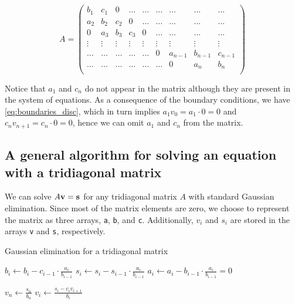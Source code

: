 \documentclass[a4paper]{article}
\begin{document}
\begin{equation}
     A = \left(\begin{array}{ccccccccc}
                   b_1 & c_1 & 0 &\dots   & \dots &\dots & \dots &\dots&\dots\\
                   a_2 & b_2 & c_2 & 0 &\dots &\dots & \dots&\dots&\dots \\
                   0 & a_3 & b_3 & c_3 & 0 & \dots & \dots&\dots&\dots \\
                   \vdots&\vdots&\vdots&\vdots&\vdots&\vdots&\vdots&\vdots&\vdots \\
                   \dots&\dots&\dots&\dots&\dots & 0 & a_{n-1}  &b_{n-1}& c_{n-1} \\
                   \dots&\dots&\dots&\dots&\dots&\dots &  0 &a_n & b_n \\
              \end{array} \right)
\end{equation}

Notice that $a_1$ and $c_{n}$ do not appear in the matrix although they are present in the system of equations. As a consequence of the boundary conditions, we have \eqref{eq:boundaries_disc}, which in turn implies $a_1 v_{0} = a_1 \cdot 0 = 0$ and $c_n v_{n+1} = c_n \cdot 0 = 0$, hence we can omit $a_1$ and $c_{n}$ from the matrix.



\subsection{A general algorithm for solving an equation with a tridiagonal matrix}\label{subsec:gen_alg}
We can solve $A {\bf v} = {\bf s}$ for any tridiagonal matrix $A$ with standard Gaussian elimination. Since most of the matrix elements are zero, we choose to represent the matrix as three arrays, \texttt{a}, \texttt{b}, and \texttt{c}. Additionally, $v_{i}$ and $s_i$ are stored in the arrays \texttt{v} and \texttt{s}, respectively.

\begin{algorithm}
\caption{Gaussian elimination for a tridiagonal matrix} \label{alg:gaussian-general-tridiagonal}
\begin{algorithmic}[1]
   
    \State $b_i \gets b_i - c_{i-1}\cdot \frac{a_i}{b_{i-1}}$ 
    \State $s_i \gets s_i - s_{i-1}\cdot \frac{a_i}{b_{i-1}}$ 
    \State $a_i \gets a_i - b_{i-1}\cdot \frac{a_i}{b_{i-1}} = 0$  \label{alg_line:update_a}
  \EndFor

  \Statex {}
  \State $v_n \gets \frac{s_n}{b_n}$
    \State $v_i \gets \frac{s_i - c_i v_{i+1}}{b_i}$
  \EndFor
\end{algorithmic}
\end{algorithm}
\end{document}
